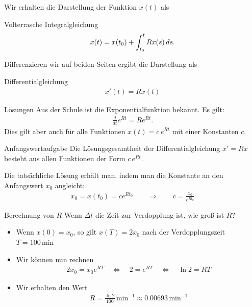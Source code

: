 \begin{frame}
  Wir erhalten die Darstellung der Funktion $x(t)$ als
  \begin{block}{Volterrasche Integralgleichung}
    \begin{gather*}
      x(t) = x(t_0) + \int_{t_0}^t R x(s) \,ds.      
    \end{gather*}    
  \end{block}

  Differenzieren wir auf beiden Seiten ergibt die Darstellung als
  \begin{block}{Differentialgleichung}
    \begin{gather*}
          x'(t) = R x(t)
    \end{gather*}
  \end{block}
\end{frame}

\begin{frame}{Lösungen}
  Aus der Schule ist die Exponentialfunktion bekannt. Es gilt:
  \begin{gather*}
    \tfrac d{dt} e^{Rt} = R e^{Rt}.
  \end{gather*}
  Dies gilt aber auch für alle Funktionen $x(t) = c \,e^{Rt}$ mit einer Konstanten $c$.

  \begin{block}{Anfangswertaufgabe}
    Die Lösungsgesamtheit der Differentialgleichung $x' = Rx$ besteht
    aus allen Funktionen der Form $c\,e^{Rt}$.

    \vspace{1ex}

    Die tatsächliche Lösung erhält man, indem man die Konstante an den Anfangswert $x_0$ angleicht:
    \begin{gather*}
      x_0 = x(t_0) = c e^{Rt_0} \qquad \Rightarrow \qquad c = \frac{x_0}{e^{R t_0}}
    \end{gather*}
  \end{block}
\end{frame}

\begin{frame}{Berechnung von $R$}
  Wenn $\Delta t$ die Zeit zur Verdopplung ist, wie groß ist $R$?
  \begin{itemize}
  \item Wenn $x(0) = x_0$, so gilt $x(T)=2x_0$ nach der Verdopplungszeit
    $T=100 \,\text{min}$
  \item Wir können nun rechnen
    \begin{gather*}
      2 x_0 = x_0 e^{RT}
      \quad\Leftrightarrow\quad
      2 = e^{RT}
      \quad\Leftrightarrow\quad
      \ln 2 = RT
    \end{gather*}
  \item Wir erhalten den Wert
    \begin{gather*}
      R=\frac{\ln 2}{100} \,\text{min}^{-1}  \approx 0.00693 \,\text{min}^{-1}
    \end{gather*}
  \end{itemize}
\end{frame}

